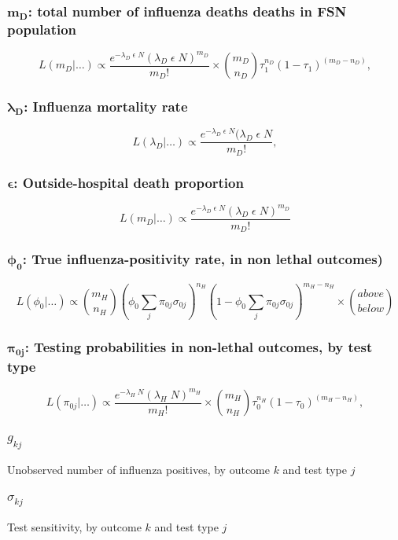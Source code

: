 \documentclass{article}[12pt]
\begin{document}
\subsubsection*{$\bm{m_D}$: total number of influenza deaths deaths in FSN population}
%
%
\begin{equation}
\label{eq:m_D}
L(m_D|\ldots) \propto \frac{e^{-\lambda_D\;\epsilon  \; N} (\lambda_D\;\epsilon  \; N)^{m_D}}{m_D!}\times \binom{m_D}{n_D} \tau_1^{n_D} (1 - \tau_1)^{(m_D - n_D)},
\end{equation}
%
%
\subsubsection*{$\bm{\lambda_D}$: Influenza mortality rate}
%
\begin{equation}
\label{eq:lam_D}
L(\lambda_D|\ldots) \propto \frac{e^{-\lambda_D\;\epsilon  \; N} (\lambda_D\;\epsilon  \; N}{m_D!},
\end{equation}
%
\subsubsection*{$\bm{\epsilon}$: Outside-hospital death proportion}
%
\begin{equation}
\label{eq:p_osh}
L(m_D|\ldots) \propto \frac{e^{-\lambda_D\;\epsilon  \; N} (\lambda_D\;\epsilon  \; N)^{m_D}}{m_D!}
\end{equation}
%
\subsubsection*{$\bm{\phi_0}$: True influenza-positivity rate, in non lethal outcomes)}
%
\begin{equation}
\label{eq:phi_0}
L(\phi_0|\ldots) \propto \binom{m_H}{n_H} \left(\phi_0 \sum_{j} \pi_{0j} \sigma_{0j}\right)^{n_H} (1 - \phi_0 \sum_{j} \pi_{0j} \sigma_{0j})^{m_H - n_H} \times
\binom{above}{below}
\end{equation}
%

\subsubsection*{$\bm{\pi_{0j}}$: Testing probabilities in non-lethal outcomes, by test type}
%
\begin{equation}
\label{eq:pi_kj}
L(\pi_{0j}|\ldots) \propto \frac{e^{-\lambda_H \; N} (\lambda_H \; N)^{m_H}}{m_H!}\times \binom{m_H}{n_H} \tau_0^{n_H} (1 - \tau_0)^{(m_H - n_H)},
\end{equation}
%
	
\subsubsection*{$g_{kj}$} Unobserved number of influenza positives, by outcome $k$ and test type $j$
\subsubsection*{$\sigma_{kj}$} Test sensitivity, by outcome $k$ and test type $j$
%
\end{document}
